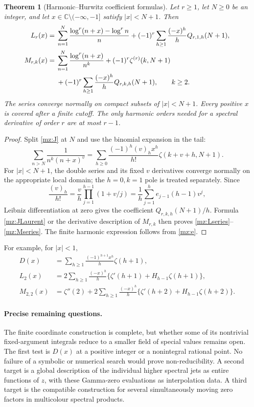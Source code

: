 \documentclass[11pt,letterpaper]{article}
\numberwithin{equation}{section}
\theoremstyle{plain}
\newtheorem{theorem}{Theorem}[section]
\theoremstyle{definition}
\theoremstyle{remark}
\begin{document}
\begin{theorem}[Harmonic--Hurwitz coefficient formulas]
\label{mz:thm:coefficients}
Let $r\ge1$, let $N\ge0$ be an integer, and let
$x\in\mathbb C\setminus(-\infty,-1]$ satisfy $|x|<N+1$. Then
\begin{align}
 L_r(x)={}&\sum_{n=1}^{N}
        \frac{\log^r(n+x)-\log^r n}{n}
   +(-1)^r\sum_{h\ge1}\frac{(-x)^h}{h}Q_{r,1,h}(N+1),
       \label{mz:Lseries}\\
 M_{r,k}(x)={}&\sum_{n=1}^{N}\frac{\log^r(n+x)}{n^k}
       +(-1)^r\zeta^{(r)}(k,N+1)\notag\\
 &+(-1)^r\sum_{h\ge1}\frac{(-x)^h}{h}Q_{r,k,h}(N+1),
       \qquad k\ge2.
       \label{mz:Mseries}
\end{align}
The series converge normally on compact subsets of $|x|<N+1$.
Every positive $x$ is covered after a finite cutoff. The only harmonic
orders needed for a spectral derivative of order $r$ are at most $r-1$.
\end{theorem}

\begin{proof}
Split \eqref{mz:J} at $N$ and use the binomial expansion in the tail:
\[
 \sum_{n>N}\frac1{n^k(n+x)^v}
   =\sum_{h\ge0}\frac{(-1)^h(v)_h x^h}{h!}
                                      \zeta(k+v+h,N+1).
\]
For $|x|<N+1$, the double series and its fixed $v$ derivatives converge
normally on the appropriate local domain; the $h=0,k=1$ pole is treated
separately. Since
\[
 \frac{(v)_h}{h!}=\frac vh
       \prod_{j=1}^{h-1}(1+v/j)
       =\frac1h\sum_{j=1}^{h}e_{j-1}(h-1)v^j,
\]
Leibniz differentiation at zero gives the coefficient
$Q_{r,k,h}(N+1)/h$. Formula \eqref{mz:JLaurent} or the derivative
description of $M_{r,k}$ then proves \eqref{mz:Lseries}--\eqref{mz:Mseries}.
The finite harmonic expression follows from \eqref{mz:e}.
\end{proof}

For example, for $|x|<1$,
\begin{align}
 D(x)&=\sum_{h\ge1}\frac{(-1)^{h+1}x^h}{h}\zeta(h+1),\\
 L_2(x)&=2\sum_{h\ge1}\frac{(-x)^h}{h}
       \bigl\{\zeta'(h+1)+H_{h-1}\zeta(h+1)\bigr\},\\
 M_{2,2}(x)&=\zeta''(2)+2\sum_{h\ge1}\frac{(-x)^h}{h}
       \bigl\{\zeta'(h+2)+H_{h-1}\zeta(h+2)\bigr\}.
\end{align}

\paragraph{Precise remaining questions.}
The finite coordinate construction is complete, but whether some of its
nontrivial fixed-argument integrals reduce to a smaller field of special
values remains open. The first test is $D(x)$ at a positive integer or a
nonintegral rational point. No failure of a symbolic or numerical search
would prove non-reducibility. A second target is a global description of
the individual higher spectral jets as entire functions of $z$, with these
Gamma-zero evaluations as interpolation data. A third target is the
compatible construction for several simultaneously moving zero factors
in multicolour spectral products.
\end{document}
